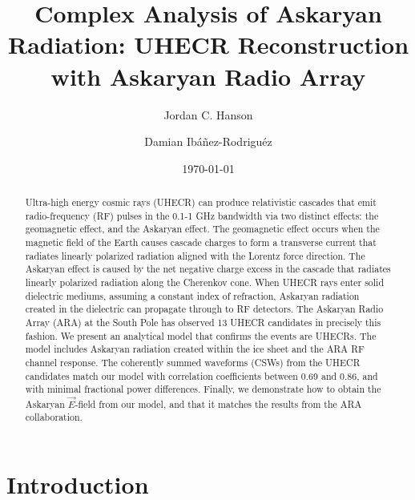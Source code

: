 \documentclass[amsmath,amssymb,aps,prd,10pt,twocolumn,showkeys]{revtex4}
\begin{document}
\title{Complex Analysis of Askaryan Radiation: UHECR Reconstruction with Askaryan Radio Array}

\author{Jordan C. Hanson}
\author{Damian Ibá\~{n}ez-Rodriguéz}
\date{\today}

\begin{abstract}
Ultra-high energy cosmic rays (UHECR) can produce relativistic cascades that emit radio-frequency (RF) pulses in the 0.1-1 GHz bandwidth via two distinct effects: the geomagnetic effect, and the Askaryan effect.  The geomagnetic effect occurs when the magnetic field of the Earth causes cascade charges to form a transverse current that radiates linearly polarized radiation aligned with the Lorentz force direction.  The Askaryan effect is caused by the net negative charge excess in the cascade that radiates linearly polarized radiation along the Cherenkov cone.  When UHECR rays enter solid dielectric mediums, assuming a constant index of refraction, Askaryan radiation created in the dielectric can propagate through to RF detectors.  The Askaryan Radio Array (ARA) at the South Pole has observed 13 UHECR candidates in precisely this fashion.  We present an analytical model that confirms the events are UHECRs.  The model includes Askaryan radiation created within the ice sheet and the ARA RF channel response.  The coherently summed waveforms (CSWs) from the UHECR candidates match our model with correlation coefficients between 0.69 and 0.86, and with minimal fractional power differences.  Finally, we demonstrate how to obtain the Askaryan $\vec{E}$-field from our model, and that it matches the results from the ARA collaboration.
\end{abstract}


\maketitle

\section{Introduction}
\label{sec:int}
\end{document}
